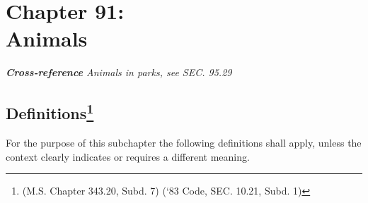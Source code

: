 \chapter*{Chapter 91: \\
	Animals}
    \vfill
    \minitoc
    \emph{\textbf{Cross-reference} Animals in parks, see SEC. 95.29}
    \pagebreak


\section{Definitions\footnote{(M.S. Chapter 343.20, Subd. 7)  (‘83 Code, SEC. 10.21, Subd. 1)}}
For the purpose of this subchapter the following definitions shall apply, unless the context clearly indicates or requires a different meaning.

